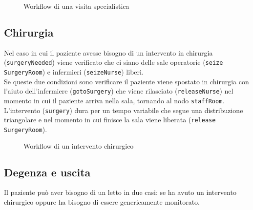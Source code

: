 \begin{figure}[!htb]
    \centering
    \caption{Workflow di una visita specialistica}
\end{figure}

\clearpage
\subsection{Chirurgia}  
Nel caso in cui il paziente avesse bisogno di un intervento in chirurgia (\texttt{surgeryNeeded}) viene verificato che ci siano delle sale operatorie (\texttt{seize SurgeryRoom}) e 
infermieri (\texttt{seizeNurse}) liberi.
\\ Se queste due condizioni sono verificare il paziente viene spostato in chirurgia con l'aiuto dell’infermiere (\texttt{gotoSurgery}) che viene rilasciato (\texttt{releaseNurse}) nel momento in cui il paziente arriva nella sala, tornando al nodo \texttt{staffRoom}. \\
L’intervento (\texttt{surgery}) dura per un tempo variabile che segue una distribuzione triangolare e nel momento in cui finisce la sala viene liberata (\texttt{release SurgeryRoom}).


\begin{figure}[!htb]
    \centering
    \caption{Workflow di un intervento chirurgico}
\end{figure}

\subsection{Degenza e uscita}  
Il paziente può aver bisogno di un letto in due casi: se ha avuto un intervento chirurgico oppure ha bisogno di essere genericamente monitorato. 


